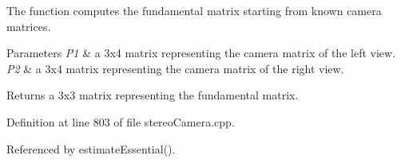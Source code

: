 The function computes the fundamental matrix starting from known camera matrices. 


\begin{DoxyParams}{Parameters}
{\em P1} & a 3x4 matrix representing the camera matrix of the left view. \\
\hline
{\em P2} & a 3x4 matrix representing the camera matrix of the right view. \\
\hline
\end{DoxyParams}
\begin{DoxyReturn}{Returns}
a 3x3 matrix representing the fundamental matrix. 
\end{DoxyReturn}


Definition at line 803 of file stereo\+Camera.\+cpp.



Referenced by estimate\+Essential().


